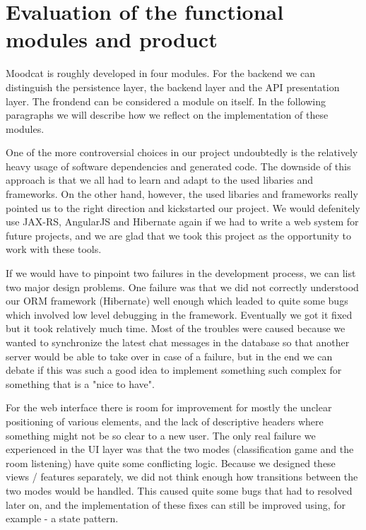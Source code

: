 
\chapter{Evaluation of the functional modules and product}

Moodcat is roughly developed in four modules.
For the backend we can distinguish the persistence layer, the backend layer and the API presentation layer.
The frondend can be considered a module on itself.
In the following paragraphs we will describe how we reflect on the implementation of these modules.

One of the more controversial choices in our project undoubtedly is the relatively heavy usage of software dependencies and generated code.
The downside of this approach is that we all had to learn and adapt to the used libaries and frameworks.
On the other hand, however, the used libaries and frameworks really pointed us to the right direction and kickstarted our project.
We would defenitely use JAX-RS, AngularJS and Hibernate again if we had to write a web system for future projects, and we are glad that we took this project as the opportunity to work with these tools.


If we would have to pinpoint two failures in the development process, we can list two major design problems. One failure was that we did not correctly understood our ORM framework (Hibernate) well enough which leaded to quite some bugs which involved low level debugging in the framework.
Eventually we got it fixed but it took relatively much time. Most of the troubles were caused because we wanted to synchronize the latest chat messages in the database so that another server would be able to take over in case of a failure, but in the end we can debate if this was such a good idea to implement something such complex for something that is a "nice to have".

For the web interface there is room for improvement for mostly the unclear positioning of various elements, and the lack of descriptive headers where something might not be so clear to a new user.
The only real failure we experienced in the UI layer was that the two modes (classification game and the room listening) have quite some conflicting logic.
Because we designed these views / features separately, we did not think enough how transitions between the two modes would be handled. This caused quite some bugs that had to resolved later on, and the implementation of these fixes can still be improved using, for example - a state pattern.

